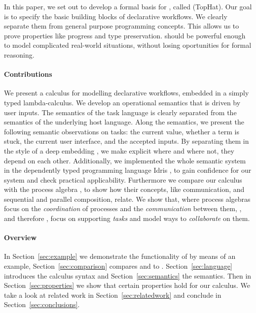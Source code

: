 
In this paper, we set out to develop a formal basis for \TOP, called \TOPHAT (TopHat).
Our goal is to specify the basic building blocks of declarative workflows.
We clearly separate them from general purpose programming concepts.
This allows us to prove properties like progress and type preservation.
\TOPHAT should be powerful enough to model complicated real-world situations,
without losing oportunities for formal reasoning.



\paragraph{Contributions}

We present a calculus for modelling declarative workflows, embedded in a simply typed lambda-calculus.
We develop an operational semantics that is driven by user inputs.
The semantics of the task language is clearly separated from the semantics of the underlying host language.
Along the semantics, we present the following semantic observations on tasks: the current value, whether a term is stuck, the current user interface, and the accepted inputs.
By separating them in the style of a deep embedding \cite{conf/cefp/Gibbons13}, we make explicit where and where not, they depend on each other.
Additionally, we implemented the whole semantic system in the dependently typed programming language Idris \cite{journals/jfp/Brady13},
to gain confidence for our system and check practical applicability.
Furthermore we compare our calculus with the process algebra \CSP, to show how their concepts, like communication, and sequential and parallel composition, relate.
We show that, where process algebras focus on the \emph{coordination} of processes and the \emph{communication} between them,
\TOP, and therefore \TOPHAT, focus on supporting \emph{tasks} and model ways to \emph{collaborate} on them.



\paragraph{Overview}

In Section~\ref{sec:example} we demonstrate the functionality of \TOPHAT by means of an example,
Section~\ref{sec:comparison} compares \TOP and \TOPHAT to \CSP.
Section~\ref{sec:language} introduces the \TOPHAT calculus syntax
and Section~\ref{sec:semantics} the semantics.
Then in Section~\ref{sec:properties} we show that certain properties hold for our calculus.
We take a look at related work in Section~\ref{sec:relatedwork}
and conclude in Section~\ref{sec:conclusions}.
